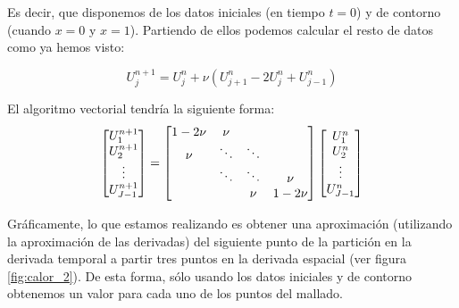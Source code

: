 Es decir, que disponemos de los datos iniciales (en tiempo $t=0$) y de contorno (cuando $x=0$ y $x=1$). Partiendo de ellos podemos calcular el resto de datos como ya hemos visto:

$$U_j^{n+1} = U_j^n+\nu\left(U_{j+1}^n - 2 U_j^n + U_{j-1}^n\right)$$

El algoritmo vectorial tendría la siguiente forma:
\begin{equation*}
	\begin{array}{l l l}
		\begin{bmatrix}
			U_1^{n+1}\\
			U_2^{n+1}\\
			\vdots\\
			U_{J-1}^{n+1}\\
		\end{bmatrix}
		=
		\begin{bmatrix}
			1-2\nu & \nu       &        & \\
			\nu    & \ddots    & \ddots & \\
			          & \ddots & \ddots & \nu\\
			          &        & \nu    & 1-2\nu\\
		\end{bmatrix}
		\begin{bmatrix}
			U_1^{n}\\
			U_2^{n}\\
			\vdots\\
			U_{J-1}^{n}\\
		\end{bmatrix}
	\end{array}
\end{equation*}

Gráficamente, lo que estamos realizando es obtener una aproximación (utilizando la aproximación de las derivadas) del siguiente punto de la partición en la derivada temporal a partir tres puntos en la derivada espacial (ver figura \ref{fig:calor_2}). De esta forma, sólo usando los datos iniciales y de contorno obtenemos un valor para cada uno de los puntos del mallado.

